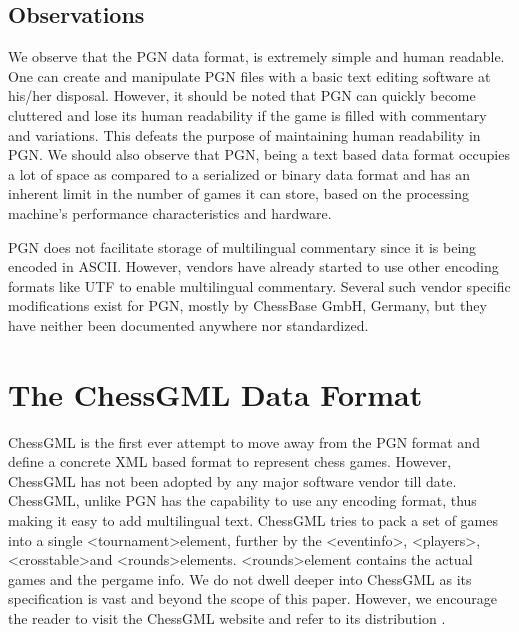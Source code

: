 \documentclass[conference]{IEEEtran}
\begin{document}
\subsection{Observations}

We observe that the PGN data format, is extremely simple and human readable. One can create and manipulate PGN files with a basic text editing software at his/her disposal. However, it should be noted that PGN can quickly become cluttered and lose its human readability if the game is filled with commentary and variations. This defeats the purpose of maintaining human readability in PGN. We should also observe that PGN, being a text based data format occupies a lot of space as compared to a serialized or binary data format and has an inherent limit in the number of games it can store, based on the processing machine's performance characteristics and hardware.

PGN does not facilitate storage of multilingual commentary since it is being encoded in ASCII. However, vendors have already started to use other encoding formats like UTF \cite{ab03}
 to enable multilingual commentary. Several such vendor specific modifications exist for PGN, mostly by ChessBase GmbH, Germany, but they have neither been documented anywhere nor standardized.




\section{The ChessGML Data Format}

ChessGML is the first ever attempt to move away from the PGN format and define a concrete XML based format to represent chess games. However, ChessGML has not been adopted by any major software vendor till date. ChessGML, unlike PGN has the capability to use any encoding format, thus making it easy to add multilingual text. ChessGML tries to pack a set of games into a single \textless tournament\textgreater  element, further by the \textless eventinfo\textgreater , \textless players\textgreater , \textless crosstable\textgreater  and \textless rounds\textgreater  elements. \textless rounds\textgreater  element contains the actual games and the per\textendash game info. We do not dwell deeper into ChessGML as its specification is vast and beyond the scope of this paper. However, we encourage the reader to visit the ChessGML website and refer to its distribution \cite{ab04}
.
\end{document}
